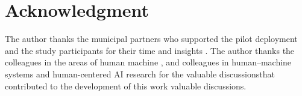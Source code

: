 \documentclass[journal]{IEEEtran}
\theoremstyle{plain}
\theoremstyle{definition}
\providecommand{\DIFaddtex}[1]{{\protect\color{blue} \sf #1}} %
\providecommand{\DIFdeltex}[1]{{\protect\color{red} \scriptsize #1}} %
\providecommand{\DIFaddbegin}{} %
\providecommand{\DIFaddend}{} %
\providecommand{\DIFdelbegin}{} %
\providecommand{\DIFdelend}{} %
\providecommand{\DIFadd}[1]{\texorpdfstring{\DIFaddtex{#1}}{#1}} %
\providecommand{\DIFdel}[1]{\texorpdfstring{\DIFdeltex{#1}}{}} %
\newcommand{\DIFscaledelfig}{0.5}
\newlength{\DIFdelgraphicswidth} %
\newlength{\DIFdelgraphicsheight} %
\newcommand{\DIFaddincludegraphics}[2][]{{\color{blue}\fbox{\DIFOincludegraphics[#1]{#2}}}} %
\newcommand{\DIFdelincludegraphics}[2][]{%
\sbox{\DIFdelgraphicsbox}{\DIFOincludegraphics[#1]{#2}}%
\settoboxwidth{\DIFdelgraphicswidth}{\DIFdelgraphicsbox} %
\settoboxtotalheight{\DIFdelgraphicsheight}{\DIFdelgraphicsbox} %
\scalebox{\DIFscaledelfig}{%
\parbox[b]{\DIFdelgraphicswidth}{\usebox{\DIFdelgraphicsbox}\\[-\baselineskip] \rule{\DIFdelgraphicswidth}{0em}}\llap{\resizebox{\DIFdelgraphicswidth}{\DIFdelgraphicsheight}{%
\setlength{\unitlength}{\DIFdelgraphicswidth}%
\begin{picture}(1,1)%
\thicklines\linethickness{2pt} %
{\color[rgb]{1,0,0}\put(0,0){\framebox(1,1){}}}%
{\color[rgb]{1,0,0}\put(0,0){\line( 1,1){1}}}%
{\color[rgb]{1,0,0}\put(0,1){\line(1,-1){1}}}%
\end{picture}%
}\hspace*{3pt}}} %
} %
\DeclareRobustCommand{\DIFaddbegin}{\DIFOaddbegin \let\includegraphics\DIFaddincludegraphics} %
\DeclareRobustCommand{\DIFaddend}{\DIFOaddend \let\includegraphics\DIFOincludegraphics} %
\DeclareRobustCommand{\DIFdelbegin}{\DIFOdelbegin \let\includegraphics\DIFdelincludegraphics} %
\DeclareRobustCommand{\DIFdelend}{\DIFOaddend \let\includegraphics\DIFOincludegraphics} %
\begin{document}
\section*{Acknowledgment}
The author thanks the \DIFdelbegin \DIFdel{municipal partners who supported the pilot deployment and the }\DIFdelend study participants for their time and insights\DIFdelbegin \DIFdel{. The author thanks the colleagues in the areas of human machine }\DIFdelend \DIFaddbegin \DIFadd{, and colleagues in human--machine }\DIFaddend systems and human-centered AI research for \DIFdelbegin \DIFdel{the valuable discussionsthat contributed to the development of this work}\DIFdelend \DIFaddbegin \DIFadd{valuable discussions}\DIFaddend .


% 
\end{document}

